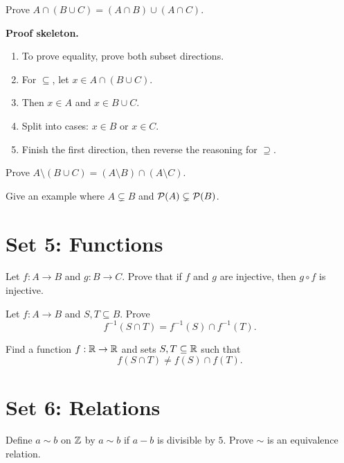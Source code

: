 \documentclass[11pt]{article}
\begin{document}
\begin{exercise}
Prove $A\cap(B\cup C)=(A\cap B)\cup(A\cap C)$.
\end{exercise}

\textbf{Proof skeleton.}
\begin{enumerate}
\item To prove equality, prove both subset directions.
\item For $\subseteq$, let $x\in A\cap(B\cup C)$.
\item Then $x\in A$ and $x\in B\cup C$.
\item Split into cases: $x\in B$ or $x\in C$.
\item Finish the first direction, then reverse the reasoning for $\supseteq$.
\end{enumerate}

\begin{exercise}
Prove $A\setminus(B\cup C)=(A\setminus B)\cap(A\setminus C)$.
\end{exercise}

\begin{exercise}
Give an example where $A\subsetneq B$ and $\mathcal{P}(A)\subsetneq\mathcal{P}(B)$.
\end{exercise}

\section{Set 5: Functions}

\begin{exercise}
Let $f:A\to B$ and $g:B\to C$. Prove that if $f$ and $g$ are injective, then $g\circ f$ is injective.
\end{exercise}

\begin{exercise}
Let $f:A\to B$ and $S,T\subseteq B$. Prove
\[
f^{-1}(S\cap T)=f^{-1}(S)\cap f^{-1}(T).
\]
\end{exercise}

\begin{exercise}
Find a function $f:\mathbb{R}\to\mathbb{R}$ and sets $S,T\subseteq\mathbb{R}$ such that
\[
f(S\cap T)\neq f(S)\cap f(T).
\]
\end{exercise}

\section{Set 6: Relations}

\begin{exercise}
Define $a\sim b$ on $\mathbb{Z}$ by $a\sim b$ if $a-b$ is divisible by $5$. Prove $\sim$ is an equivalence relation.
\end{exercise}
\end{document}
